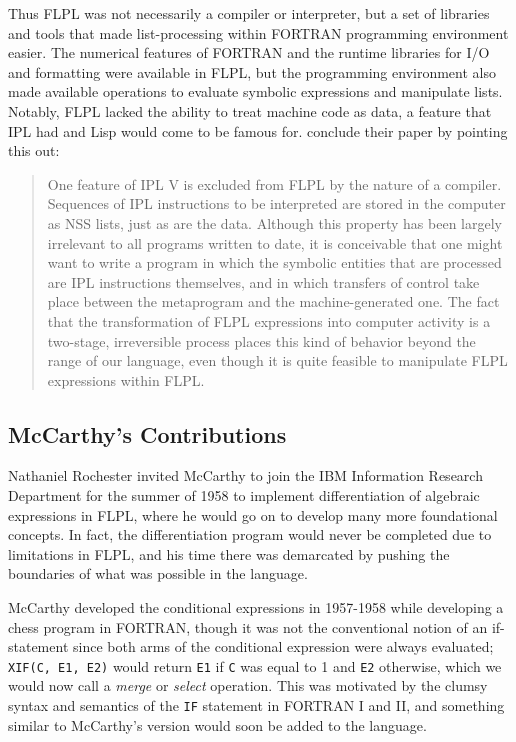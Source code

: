 Thus FLPL was not necessarily a compiler or interpreter, but a set of libraries and tools
that made list-processing within FORTRAN programming environment easier.
The numerical features of FORTRAN and the runtime libraries for I/O and formatting
were available in FLPL, but the programming environment also made available operations
to evaluate symbolic expressions and manipulate lists.
Notably, FLPL lacked the ability to treat machine code as data, a feature that IPL had
and Lisp would come to be famous for.
\citeauthor{gelernter_flpl_1960} conclude their paper by pointing this out:

\begin{quotation}
	One feature of IPL V is excluded from FLPL by the nature of a compiler.
	Sequences of IPL instructions to be interpreted are stored in the computer as
	NSS lists, just as are the data. Although this property has been largely irrelevant
	to all programs written to date, it is conceivable that one might want to write
	a program in which the symbolic entities that are processed are IPL instructions
	themselves, and in which transfers of control take place between the metaprogram and
	the machine-generated one. The fact that the transformation of
	FLPL expressions into computer activity is a two-stage, irreversible process
	places this kind of behavior beyond the range of our language, even though it is
	quite feasible to manipulate FLPL expressions within FLPL.
\end{quotation}

\subsection{McCarthy's Contributions}

Nathaniel Rochester invited McCarthy to join the IBM Information Research Department for the
summer of 1958 to implement differentiation of algebraic expressions in FLPL,
where he would go on to develop many more foundational concepts.
In fact, the differentiation program would never be completed due to limitations in FLPL,
and his time there was demarcated by pushing the boundaries of what was possible in
the language.

McCarthy developed the conditional expressions in 1957-1958 while developing a chess program
in FORTRAN, though it was not the conventional notion of an if-statement since both arms
of the conditional expression were always evaluated; \texttt{XIF(C, E1, E2)} would return
\texttt{E1} if \texttt{C} was equal to 1 and \texttt{E2} otherwise, which we would now call
a \textit{merge} or \textit{select} operation.
This was motivated by the clumsy syntax and semantics of the \texttt{IF} statement in FORTRAN I and II,
and something similar to McCarthy's version would soon be added to the language.

